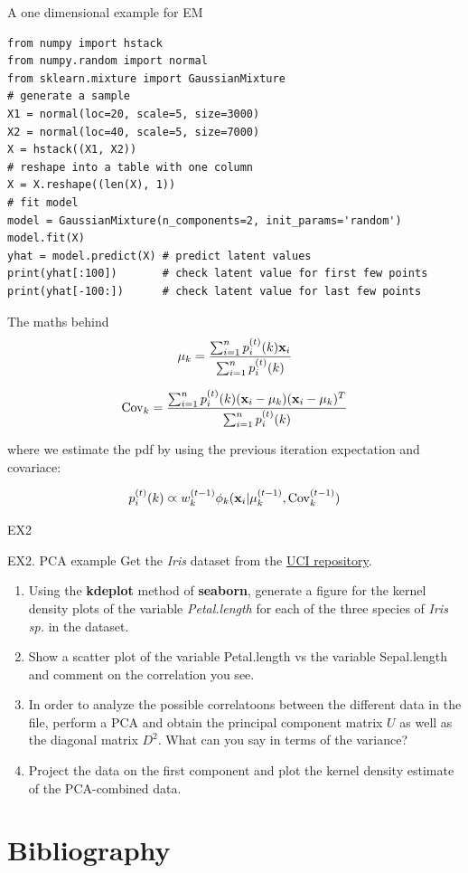 \documentclass{beamer}
\begin{document}
\begin{frame}[fragile]{A one dimensional example for EM}
    \begin{lstlisting}
from numpy import hstack
from numpy.random import normal
from sklearn.mixture import GaussianMixture
# generate a sample
X1 = normal(loc=20, scale=5, size=3000)
X2 = normal(loc=40, scale=5, size=7000)
X = hstack((X1, X2))
# reshape into a table with one column
X = X.reshape((len(X), 1))
# fit model
model = GaussianMixture(n_components=2, init_params='random')
model.fit(X)
yhat = model.predict(X) # predict latent values
print(yhat[:100])       # check latent value for first few points
print(yhat[-100:])      # check latent value for last few points
    \end{lstlisting}
\end{frame}

\begin{frame}{The maths behind}
    \[\mu_k = \frac{\sum_{i=1}^n p_i^{(t)}(k)\textbf{x}_i}{\sum_{i=1}^n p_i^{(t)}(k)}\]

    \[\mathrm{Cov}_k=\frac{\sum_{i=1}^n p_i^{(t)}(k)(\textbf{x}_i-\mu_k)(\textbf{x}_i-\mu_k)^T}{\sum_{i=1}^n p_i^{(t)}(k)}\]

    where we estimate the pdf by using the previous iteration expectation and covariace:

    \[p_i^{(t)}(k) \varpropto w_k^{(t-1)} \phi_k(\textbf{x}_i | \mu_k^{(t-1)},\mathrm{Cov}_k^{(t-1)})\]
\end{frame}

\begin{frame}{EX2}
    \begin{Exercise}{EX2. PCA example}
        Get the {\em Iris} dataset from the \href{https://archive.ics.uci.edu}{UCI repository}. 
        \begin{enumerate}
            \item Using the {\bf kdeplot} method of {\bf seaborn}, generate a figure for the kernel density plots of the variable {\em Petal.length} for each of the three species of {\em Iris sp.} in the dataset.
            \item Show a scatter plot of the variable Petal.length vs the variable Sepal.length and comment on the correlation you see. 
            \item In order to analyze the possible correlatoons between the different data in the file, perform a PCA and obtain the principal component matrix $U$ as well as the diagonal matrix $D^2$. What can you say in terms of the variance?
            \item Project the data on the first component and plot the kernel density estimate of the PCA-combined data. 
        \end{enumerate}
    \end{Exercise}
\end{frame}

\section{Bibliography}


\end{document}
